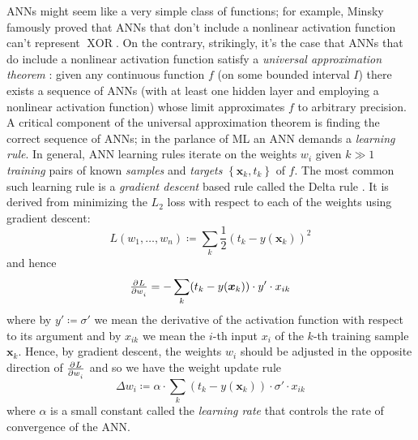ANNs might seem like a very simple class of functions; for example, Minsky \etal \cite{minsky2017perceptrons} famously proved that ANNs that don't include a nonlinear activation function can't represent \(\operatorname{XOR}\). 
%
On the contrary, strikingly, it's the case that ANNs that do include a nonlinear activation function satisfy a \textit{universal approximation theorem} \cite{cybenko1989approximation}:
%
given any continuous function \(f\) (on some bounded interval \(I\)) there exists a sequence of ANNs (with at least one hidden layer and employing a nonlinear activation function) whose limit approximates \(f\) to arbitrary precision.
%
A critical component of the universal approximation theorem is finding the correct sequence of ANNs; in the parlance of ML an ANN demands a \textit{learning rule}.
%
In general, ANN learning rules iterate on the weights \(w_i\) given \(k \gg 1\) \textit{training} pairs of known \textit{samples} and \textit{targets} \(\left\{ \bm{x}_k, t_k \right\}\) of \(f\). 
%
The most common such learning rule is a \textit{gradient descent} based rule called the Delta rule \cite{widrow1960adaptive}.
%
It is derived from minimizing the \(L_2\) loss with respect to each of the weights using gradient descent:
\begin{equation}
    L(w_1, \dots, w_n) \coloneqq \sum_k \frac{1}{2} (t_k - y(\mathbf{x}_k))^2
    \label{eqn:loss}
\end{equation}
and hence
\begin{equation}
    \pd{L}{w_i} = - \sum_k(t_k-y(\bm{x}_k))\cdot y'\cdot x_{ik}
\end{equation}
where by \(y' \coloneqq \sigma'\) we mean the derivative of the activation function with respect to its argument and by \(x_{ik}\) we mean the \(i\)-th input \(x_i\) of the \(k\)-th training sample \(\bm{x}_k\).
%
Hence, by gradient descent, the weights \(w_i\) should be adjusted in the opposite direction of \(\pd{L}{w_i}\) and so we have the weight update rule
\begin{equation}
    \Delta w_i \coloneqq \alpha \cdot \sum_k(t_k-y(\mathbf{x}_k))\cdot \sigma'\cdot x_{ik}
    \label{eqn:batchupdate}
\end{equation}
where \(\alpha\) is a small constant called the \textit{learning rate} that controls the rate of convergence of the ANN.

